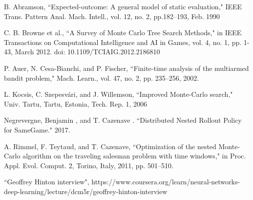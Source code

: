\documentclass[a4paper,12pt]{article}
\begin{document}
\begin{thebibliography}{0}

B. Abramson, ``Expected-outcome: A general model of static evaluation," IEEE Trans. Pattern Anal. Mach. Intell., vol. 12, no. 2, pp.182–193, Feb. 1990


C. B. Browne et al., ``A Survey of Monte Carlo Tree Search Methods," in IEEE Transactions on Computational Intelligence and AI in Games, vol. 4, no. 1, pp. 1-43, March 2012.
doi: 10.1109/TCIAIG.2012.2186810

 P. Auer, N. Cesa-Bianchi, and P. Fischer, ``Finite-time analysis of the
multiarmed bandit problem," Mach. Learn., vol. 47, no. 2, pp. 235–256,
2002.

L. Kocsis, C. Szepesvári, and J. Willemson, ``Improved Monte-Carlo
search," Univ. Tartu, Tartu, Estonia, Tech. Rep. 1, 2006

Negrevergne, Benjamin , and T. Cazenave . ``Distributed Nested Rollout Policy for SameGame." 2017.

A. Rimmel, F. Teytaud, and T. Cazenave, ``Optimization of the nested
Monte-Carlo algorithm on the traveling salesman problem with time
windows," in Proc. Appl. Evol. Comput. 2, Torino, Italy, 2011, pp.
501–510.

 ``Geoffrey Hinton interview", https://www.coursera.org/learn/neural-networks-deep-learning/lecture/dcm5r/geoffrey-hinton-interview

\end{thebibliography}
\end{document}
